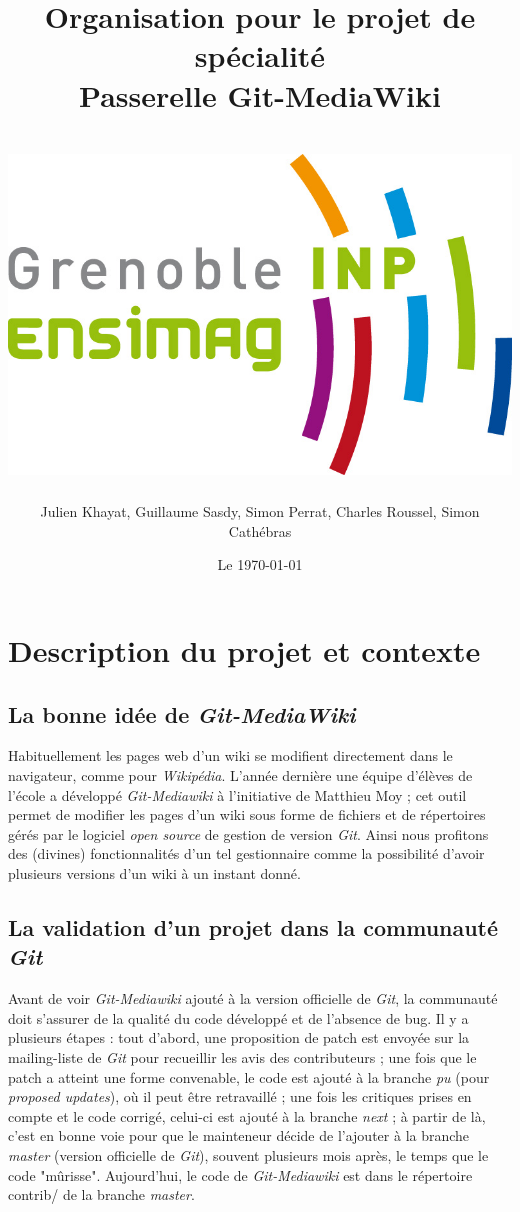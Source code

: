 \documentclass[11pt]{article}
\title{Organisation pour le projet de spécialité\\
Passerelle Git-MediaWiki\\
~\\
\includegraphics[scale=0.75]{logo_ensimag.jpg} 
}
\author{Julien Khayat, Guillaume Sasdy, Simon Perrat, Charles Roussel, Simon Cathébras}
\date{Le \today}
\begin{document}
\maketitle
\newpage

\section{Description du projet et contexte}
\subsection{La bonne idée de \textit{Git-MediaWiki}}
Habituellement les pages web d'un wiki se modifient directement dans le navigateur, comme pour \textit{Wikipédia}. L'année dernière une équipe d'élèves de l'école a développé \textit{Git-Mediawiki} à l'initiative de Matthieu Moy ; cet outil permet de modifier les pages d'un wiki sous forme de fichiers et de répertoires gérés par le logiciel \textit{open source} de gestion de version \textit{Git}. Ainsi nous profitons des (divines) fonctionnalités d'un tel gestionnaire comme la possibilité d'avoir plusieurs versions d'un wiki à un instant donné.\\
\subsection{La validation d'un projet dans la communauté \textit{Git}}
Avant de voir \textit{Git-Mediawiki} ajouté à la version officielle de \textit{Git}, la communauté doit s'assurer de la qualité du code développé et de l'absence de bug. Il y a plusieurs étapes : tout d'abord, une proposition de patch est envoyée sur la mailing-liste de \textit{Git} pour recueillir les avis des contributeurs ; une fois que le patch a atteint une forme convenable, le code est ajouté à la branche \textit{pu} (pour \textit{proposed updates}), où il peut être retravaillé ; une fois les critiques prises en compte et le code corrigé, celui-ci est ajouté à la branche \textit{next} ; à partir de là, c'est en bonne voie pour que le mainteneur décide de l'ajouter à la branche \textit{master} (version officielle de \textit{Git}), souvent plusieurs mois après, le temps que le code "mûrisse". Aujourd'hui, le code de \textit{Git-Mediawiki} est dans le répertoire contrib/ de la branche \textit{master}.\\
\end{document}
